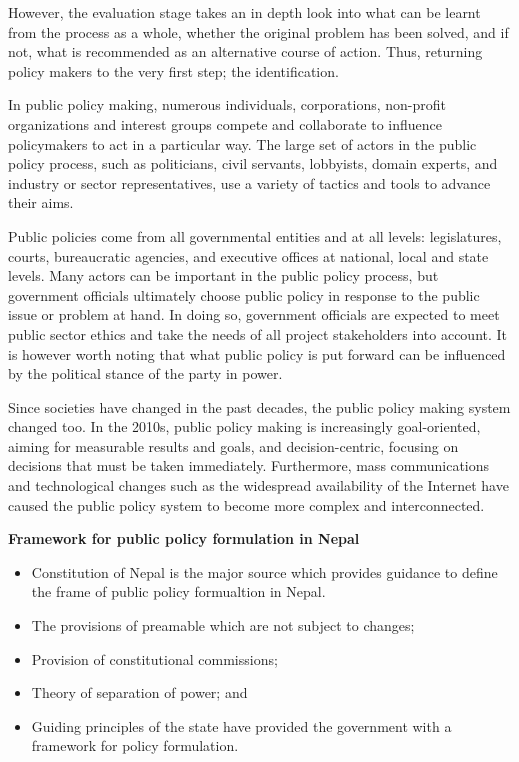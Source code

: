 \documentclass[
  openany]{book}
\providecommand{\tightlist}{%
  \setlength{\itemsep}{0pt}\setlength{\parskip}{0pt}}
\begin{document}
However, the evaluation stage takes an in depth look into what can be learnt from the process as a whole, whether the original problem has been solved, and if not, what is recommended as an alternative course of action. Thus, returning policy makers to the very first step; the identification.

In public policy making, numerous individuals, corporations, non-profit organizations and interest groups compete and collaborate to influence policymakers to act in a particular way. The large set of actors in the public policy process, such as politicians, civil servants, lobbyists, domain experts, and industry or sector representatives, use a variety of tactics and tools to advance their aims.

Public policies come from all governmental entities and at all levels: legislatures, courts, bureaucratic agencies, and executive offices at national, local and state levels. Many actors can be important in the public policy process, but government officials ultimately choose public policy in response to the public issue or problem at hand. In doing so, government officials are expected to meet public sector ethics and take the needs of all project stakeholders into account. It is however worth noting that what public policy is put forward can be influenced by the political stance of the party in power.

Since societies have changed in the past decades, the public policy making system changed too. In the 2010s, public policy making is increasingly goal-oriented, aiming for measurable results and goals, and decision-centric, focusing on decisions that must be taken immediately. Furthermore, mass communications and technological changes such as the widespread availability of the Internet have caused the public policy system to become more complex and interconnected.

\textbf{Framework for public policy formulation in Nepal}

\begin{itemize}
\tightlist
\item
  Constitution of Nepal is the major source which provides guidance to define the frame of public policy formualtion in Nepal.
\item
  The provisions of preamable which are not subject to changes;
\item
  Provision of constitutional commissions;
\item
  Theory of separation of power; and
\item
  Guiding principles of the state have provided the government with a framework for policy formulation.
\end{itemize}
\end{document}
